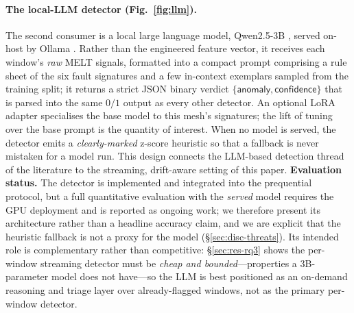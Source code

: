 \documentclass[pdflatex,sn-mathphys-num]{sn-jnl}%
\theoremstyle{thmstyleone}%
\theoremstyle{thmstyletwo}%
\theoremstyle{thmstylethree}%
\begin{document}
\paragraph{The local-LLM detector (Fig.~\ref{fig:llm}).} The second consumer is a local large language model, Qwen2.5-3B \cite{qwen2025}, served on-host by Ollama \cite{ollama2024}. Rather than the engineered feature vector, it receives each window's \emph{raw} MELT signals, formatted into a compact prompt comprising a rule sheet of the six fault signatures and a few in-context exemplars sampled from the training split; it returns a strict JSON binary verdict $\{\textsf{anomaly},\textsf{confidence}\}$ that is parsed into the same $0/1$ output as every other detector. An optional LoRA adapter \cite{hu2022lora} specialises the base model to this mesh's signatures; the lift of tuning over the base prompt is the quantity of interest. When no model is served, the detector emits a \emph{clearly-marked} z-score heuristic so that a fallback is never mistaken for a model run. This design connects the LLM-based detection thread of the literature \cite{guan2024logllm,zhuang2024multimodal} to the streaming, drift-aware setting of this paper. \textbf{Evaluation status.} The detector is implemented and integrated into the prequential protocol, but a full quantitative evaluation with the \emph{served} model requires the GPU deployment and is reported as ongoing work; we therefore present its architecture rather than a headline accuracy claim, and we are explicit that the heuristic fallback is not a proxy for the model (\S\ref{sec:disc-threats}). Its intended role is complementary rather than competitive: \S\ref{sec:res-rq3} shows the per-window streaming detector must be \emph{cheap and bounded}---properties a 3B-parameter model does not have---so the LLM is best positioned as an on-demand reasoning and triage layer over already-flagged windows, not as the primary per-window detector.
\end{document}
